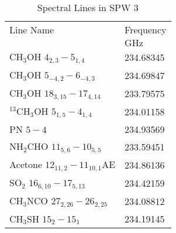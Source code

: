 \begin{table*}[htp]
\caption{Spectral Lines in SPW 3}
\begin{tabular}{ll}
\label{tab:linesspw3}
Line Name & Frequency \\
 & $\mathrm{GHz}$ \\
\hline
CH$_3$OH $4_{2,3}-5_{1,4}$ & 234.68345 \\
CH$_3$OH $5_{-4,2}-6_{-4,3}$ & 234.69847 \\
CH$_3$OH $18_{3,15}-17_{4,14}$ & 233.79575 \\
$^{13}$CH$_3$OH $5_{1,5}-4_{1,4}$ & 234.01158 \\
PN $5-4$ & 234.93569 \\
NH$_2$CHO $11_{5,6}-10_{5,5}$ & 233.59451 \\
Acetone $12_{11,2}-11_{10,1}$AE & 234.86136 \\
SO$_2$ $16_{6,10}-17_{5,13}$ & 234.42159 \\
CH$_3$NCO $27_{2,26} - 26_{2,25}$ & 234.08812 \\
CH$_3$SH $15_2-15_1$ & 234.19145 \\
\hline
\end{tabular}
\end{table*}
